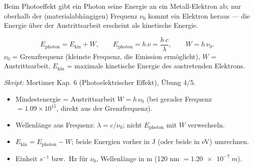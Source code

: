 

Beim Photoeffekt gibt ein Photon seine Energie an ein Metall-Elektron ab;
nur oberhalb der (materialabhängigen) Frequenz $\nu_0$ kommt ein Elektron
heraus --- die Energie über der Austrittsarbeit erscheint als kinetische
Energie.

\begin{werkzeugkasten}[Photoeffektgleichung]
\begin{equation}
  E_{\text{photon}} = E_{\text{kin}} + W,
  \qquad
  E_{\text{photon}} = h\,\nu = \frac{h\,c}{\lambda},
  \qquad
  W = h\,\nu_0.
\end{equation}
$\nu_0$ = Grenzfrequenz (kleinste Frequenz, die Emission ermöglicht),
$W$ = Austrittsarbeit, $E_{\text{kin}}$ = maximale kinetische Energie des
austretenden Elektrons.

\textit{Skript:} Mortimer Kap. 6 (Photoelektrischer Effekt), Übung 4/5.
\end{werkzeugkasten}

\begin{achtung}
\begin{itemize}
  \item Mindestenergie = Austrittsarbeit $W = h\,\nu_0$ (bei gerader Frequenz
        $= 1.09\times10^{15}$, direkt aus der Grenzfrequenz).
  \item Wellenlänge aus Frequenz: $\lambda = c/\nu_0$; nicht
        $E_{\text{photon}}$ mit $W$ verwechseln.
  \item $E_{\text{kin}} = E_{\text{photon}} - W$; beide Energien vorher in
        J (oder beide in eV) umrechnen.
  \item Einheit $s^{-1}$ bzw.\ Hz für $\nu_0$, Wellenlänge in m (120 nm
        $= \qty{1.20e-7}{m}$).
\end{itemize}
\end{achtung}
